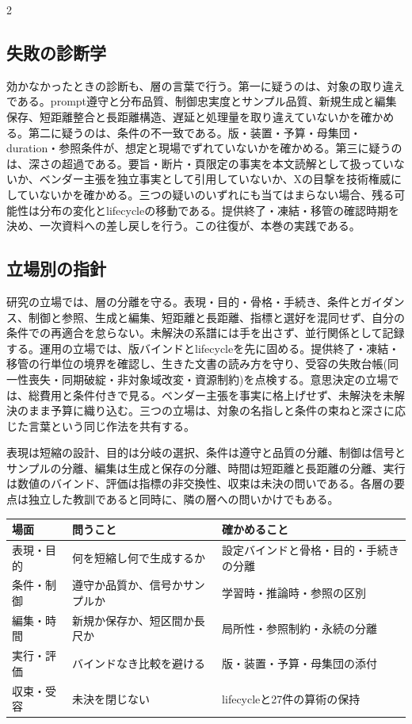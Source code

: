 \documentclass[lualatex,a4paper,10pt]{jlreq}
\begin{document}
\begin{multicols}{2}
\subsection{失敗の診断学}
効かなかったときの診断も、層の言葉で行う。第一に疑うのは、対象の取り違えである。prompt遵守と分布品質、制御忠実度とサンプル品質、新規生成と編集保存、短距離整合と長距離構造、遅延と処理量を取り違えていないかを確かめる。第二に疑うのは、条件の不一致である。版・装置・予算・母集団・duration・参照条件が、想定と現場でずれていないかを確かめる。第三に疑うのは、深さの超過である。要旨・断片・頁限定の事実を本文読解として扱っていないか、ベンダー主張を独立事実として引用していないか、Xの目撃を技術権威にしていないかを確かめる。三つの疑いのいずれにも当てはまらない場合、残る可能性は分布の変化とlifecycleの移動である。提供終了・凍結・移管の確認時期を決め、一次資料への差し戻しを行う。この往復が、本巻の実践である。

\subsection{立場別の指針}
研究の立場では、層の分離を守る。表現・目的・骨格・手続き、条件とガイダンス、制御と参照、生成と編集、短距離と長距離、指標と選好を混同せず、自分の条件での再適合を怠らない。未解決の系譜には手を出さず、並行関係として記録する。運用の立場では、版バインドとlifecycleを先に固める。提供終了・凍結・移管の行単位の境界を確認し、生きた文書の読み方を守り、受容の失敗台帳(同一性喪失・同期破綻・非対象域改変・資源制約)を点検する。意思決定の立場では、総費用と条件付きで見る。ベンダー主張を事実に格上げせず、未解決を未解決のまま予算に織り込む。三つの立場は、対象の名指しと条件の束ねと深さに応じた言葉という同じ作法を共有する。

\begin{themeoverview}[層の要点対照]
表現は短縮の設計、目的は分岐の選択、条件は遵守と品質の分離、制御は信号とサンプルの分離、編集は生成と保存の分離、時間は短距離と長距離の分離、実行は数値のバインド、評価は指標の非交換性、収束は未決の問いである。各層の要点は独立した教訓であると同時に、隣の層への問いかけでもある。
\end{themeoverview}
\end{multicols}

\begin{center}
\small
\begin{tabularx}{\textwidth}{@{}p{}p{}X@{}}
\toprule
場面 & 問うこと & 確かめること \\
\midrule
表現・目的 & 何を短縮し何で生成するか & 設定バインドと骨格・目的・手続きの分離 \\
条件・制御 & 遵守か品質か、信号かサンプルか & 学習時・推論時・参照の区別 \\
編集・時間 & 新規か保存か、短区間か長尺か & 局所性・参照制約・永続の分離 \\
実行・評価 & バインドなき比較を避ける & 版・装置・予算・母集団の添付 \\
収束・受容 & 未決を閉じない & lifecycleと27件の算術の保持 \\
\bottomrule
\end{tabularx}
\end{center}
\autocite{btd002,btd023,btd032,btd039,btd049,btd058,btd066,btd075,btd131,btd078,btd087,btd096,btd101,btd139}
\end{document}
